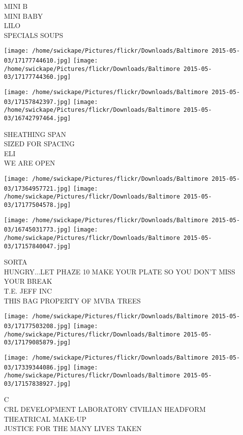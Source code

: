 \documentclass[10pt,letterpaper]{article}
\begin{document}
MINI B\\
MINI BABY\\
LILO\\
SPECIALS SOUPS\\
\pagebreak

\texttt{[image: /home/swickape/Pictures/flickr/Downloads/Baltimore 2015-05-03/17177744610.jpg]}
\texttt{[image: /home/swickape/Pictures/flickr/Downloads/Baltimore 2015-05-03/17177744360.jpg]}

\texttt{[image: /home/swickape/Pictures/flickr/Downloads/Baltimore 2015-05-03/17157842397.jpg]}
\texttt{[image: /home/swickape/Pictures/flickr/Downloads/Baltimore 2015-05-03/16742797464.jpg]}

SHEATHING SPAN\\
SIZED FOR SPACING\\
ELI\\
WE ARE OPEN\\
\pagebreak

\texttt{[image: /home/swickape/Pictures/flickr/Downloads/Baltimore 2015-05-03/17364957721.jpg]}
\texttt{[image: /home/swickape/Pictures/flickr/Downloads/Baltimore 2015-05-03/17177504578.jpg]}

\texttt{[image: /home/swickape/Pictures/flickr/Downloads/Baltimore 2015-05-03/16745031773.jpg]}
\texttt{[image: /home/swickape/Pictures/flickr/Downloads/Baltimore 2015-05-03/17157840047.jpg]}

SORTA\\
HUNGRY...LET PHAZE 10 MAKE YOUR PLATE SO YOU DON'T MISS YOUR BREAK\\
T.E. JEFF INC\\
THIS BAG PROPERTY OF MVBA TREES\\
\pagebreak

\texttt{[image: /home/swickape/Pictures/flickr/Downloads/Baltimore 2015-05-03/17177503208.jpg]}
\texttt{[image: /home/swickape/Pictures/flickr/Downloads/Baltimore 2015-05-03/17179085879.jpg]}

\texttt{[image: /home/swickape/Pictures/flickr/Downloads/Baltimore 2015-05-03/17339344086.jpg]}
\texttt{[image: /home/swickape/Pictures/flickr/Downloads/Baltimore 2015-05-03/17157838927.jpg]}

C\\
CRL DEVELOPMENT LABORATORY CIVILIAN HEADFORM\\
THEATRICAL MAKE{-}UP\\
JUSTICE FOR THE MANY LIVES TAKEN\\
\pagebreak
\end{document}

